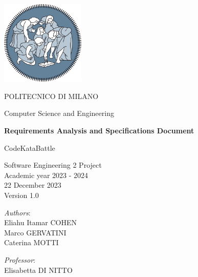 \begin{titlingpage}
	\begin{center}
		\includegraphics[width=0.3\textwidth]{images/logo_polimi.png}
		
		\vspace{0.25cm}
		
		\LARGE POLITECNICO DI MILANO\\
		
		\vspace{0.2cm}
		
		\Large Computer Science and Engineering
		
		\vspace{0.8cm}
	
		\Huge \textbf{Requirements Analysis and Specifications Document}
		
		\vspace{0.5cm}
		\huge CodeKataBattle
		
		\vspace{1.5cm}
		\LARGE Software Engineering 2 Project\\
		\Large Academic year 2023 - 2024\\
		\vspace{1cm}
		22 December 2023\\Version 1.0
		\vspace{3cm}
		
		\large
		\begin{minipage}{.4\textwidth}
			\textit{Authors}:\\
			Eliahu Itamar COHEN\\
			Marco GERVATINI\\
                Caterina MOTTI
		\end{minipage}%
		\begin{minipage}{.4\textwidth}
			\raggedleft	
			\textit{Professor}:\\
			Elisabetta DI NITTO\\
			\phantom{placeholder}
		\end{minipage}%
		\begin{minipage}{.1\textwidth}
			\null
		\end{minipage}
	
			
		\end{center}
\end{titlingpage}
